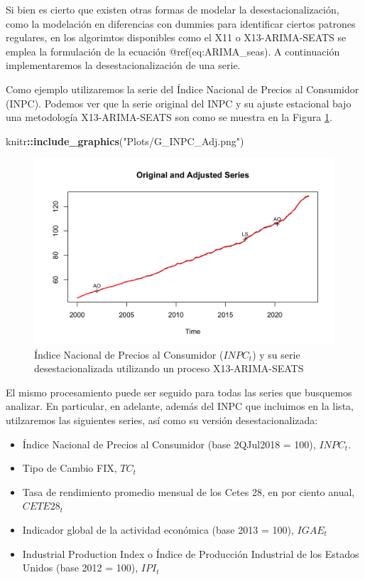\documentclass[
]{book}
\newenvironment{Shaded}{\begin{snugshade}}{\end{snugshade}}
\newcommand{\FunctionTok}[1]{\textcolor[rgb]{0.13,0.29,0.53}{\textbf{#1}}}
\newcommand{\NormalTok}[1]{#1}
\newcommand{\SpecialCharTok}[1]{\textcolor[rgb]{0.81,0.36,0.00}{\textbf{#1}}}
\newcommand{\StringTok}[1]{\textcolor[rgb]{0.31,0.60,0.02}{#1}}
\begin{document}
Si bien es cierto que existen otras formas de modelar la desestacionalización, como la modelación en diferencias con dummies para identificar ciertos patrones regulares, en los algorimtos disponibles como el X11 o X13-ARIMA-SEATS se emplea la formulación de la ecuación @ref(eq:ARIMA\_seas). A continuación implementaremos la desestacionalización de una serie.

Como ejemplo utilizaremos la serie del Índice Nacional de Precios al Consumidor (INPC). Podemos ver que la serie original del INPC y su ajuste estacional bajo una metodología X13-ARIMA-SEATS son como se muestra en la Figura \ref{fig:fig51}.

\begin{Shaded}
\begin{Highlighting}[]
\NormalTok{knitr}\SpecialCharTok{::}\FunctionTok{include\_graphics}\NormalTok{(}\StringTok{"Plots/G\_INPC\_Adj.png"}\NormalTok{) }
\end{Highlighting}
\end{Shaded}

\begin{figure}

{\centering \includegraphics[width=0.95\linewidth]{Plots/G_INPC_Adj} 

}

\caption{Índice Nacional de Precios al Consumidor ($INPC_t$) y su serie desestacionalizada utilizando un proceso X13-ARIMA-SEATS}\label{fig:fig51}
\end{figure}

El mismo procesamiento puede ser seguido para todas las series que busquemos analizar. En particular, en adelante, además del INPC que incluimos en la lista, utilzaremos las siguientes series, así como su versión desestacionalizada:

\begin{itemize}
    \item Índice Nacional de Precios al Consumidor (base 2QJul2018 = 100), $INPC_t$.
    \item Tipo de Cambio FIX, $TC_t$
    \item Tasa de rendimiento promedio mensual de los Cetes 28, en por ciento anual, $CETE28_t$
    \item Indicador global de la actividad económica (base 2013 = 100), $IGAE_t$
    \item Industrial Production Index o Índice de Producción Industrial de los Estados Unidos (base 2012 = 100), $IPI_t$
\end{itemize}
\end{document}
